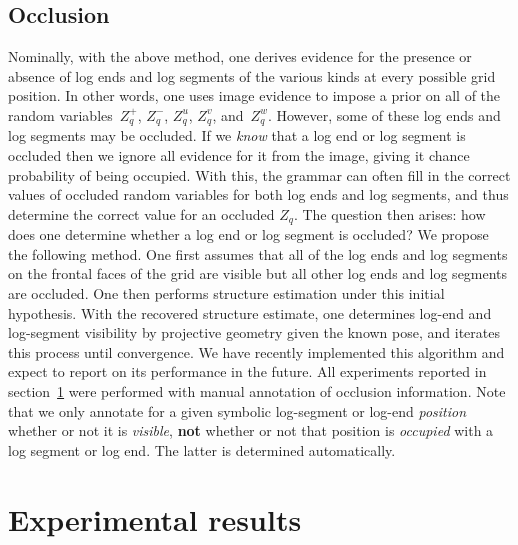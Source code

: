 \subsection{Occlusion}
\label{sec-ll1:occlusion}

Nominally, with the above method, one derives evidence for the presence or
absence of log ends and log segments of the various kinds at every possible
grid position.
%
In other words, one uses image evidence to impose a prior on all of the random
variables~$Z^+_q$, $Z^-_q$, $Z^u_q$, $Z^v_q$, and~$Z^w_q$.
%
However, some of these log ends and log segments may be occluded.
%
If we \emph{know} that a log end or log segment is occluded then we ignore all
evidence for it from the image, giving it chance probability of being occupied.
%
With this, the grammar can often fill in the correct values of occluded random
variables for both log ends and log segments, and thus determine the correct
value for an occluded $Z_q$.
%
The question then arises: how does one determine whether a log end or log
segment is occluded?
%
We propose the following method.
%
One first assumes that all of the log ends and log segments on the frontal
faces of the grid are visible but all other log ends and log segments are
occluded.
%
One then performs structure estimation under this initial hypothesis.
%
With the recovered structure estimate, one determines log-end and log-segment
visibility by projective geometry given the known pose, and iterates this
process until convergence.
%
We have recently implemented this algorithm and expect to report on its
performance in the future.
%
All experiments reported in section~\ref{sec-ll1:results} were performed with
manual annotation of occlusion information.
%
Note that we only annotate for a given symbolic log-segment or log-end
\emph{position} whether or not it is \emph{visible}, \textbf{not} whether or
not that position is \emph{occupied} with a log segment or log end.
%
The latter is determined automatically.

\section{Experimental results}
\label{sec-ll1:results}
\addtolength{\textheight}{-0.32cm}

